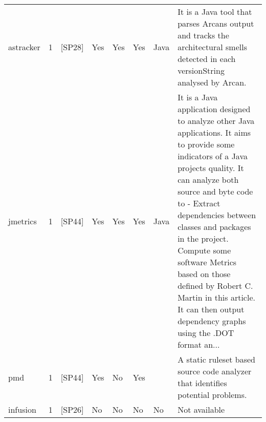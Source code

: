 \begin{tabular}{lrllllll}
           astracker &      1 &                                                 [SP28] &   Yes &      Yes &       Yes &                                                                                                                                                                                    Java &                                                                                                                                                                                                                                                                                It is a Java tool that parses Arcans output and tracks the architectural smells detected in each versionString analysed by Arcan. \\
            jmetrics &      1 &                                                 [SP44] &   Yes &      Yes &       Yes &                                                                                                                                                                                    Java &  It is a Java application designed to analyze other Java applications. It aims to provide some indicators of a Java projects quality. It can analyze both source and byte code to - Extract dependencies between classes and packages in the project. Compute some software Metrics based on those defined by Robert C. Martin in this article. It can then output dependency graphs using the .DOT format an... \\
                 pmd &      1 &                                                 [SP44] &   Yes &       No &       Yes &                                                                                                                                                                                         &                                                                                                                                                                                                                                                                                                                                  A static ruleset based source code analyzer that identifies potential problems. \\
            infusion &      1 &                                                 [SP26] &    No &       No &        No &                                                                                                                                                                                      No &                                                                                                                                                                                                                                                                                                                                                                                                    Not available \\

\end{tabular}
